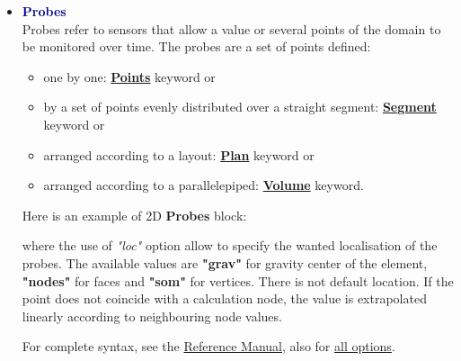\begin{itemize}
\item \textcolor{darkblue}{\textbf{Probes}}\\
Probes refer to sensors that allow a value or several points of the domain to be monitored over time.
The probes are a set of points defined:
\begin{itemize}
\item one by one: \href{\REFERENCEMANUAL\#points}{\textbf{Points}} keyword or 
\item by a set of points evenly distributed over a straight segment: \href{\REFERENCEMANUAL\#segment}{\textbf{Segment}} keyword or
\item arranged according to a layout: \href{\REFERENCEMANUAL\#plan}{\textbf{Plan}} keyword or
\item arranged according to a parallelepiped: \href{\REFERENCEMANUAL\#volume}{\textbf{Volume}} keyword.
\end{itemize}

Here is an example of 2D \textbf{Probes} block:
    \begin{center}
    \end{center}
where the use of \textit{"loc"} option allow to specify the wanted localisation of the probes. The available values are \textbf{"grav"} for gravity center of the element, \textbf{"nodes"} for faces and \textbf{"som"} for vertices. There is not default location. If the point does not coincide with a calculation node, the value is extrapolated linearly according to neighbouring node values.

For complete syntax, see the \href{\REFERENCEMANUAL\#corpspostraitement}{\trustref Reference Manual}, also for \href{\REFERENCEMANUAL\#sondes}{all options}.


\end{itemize}
